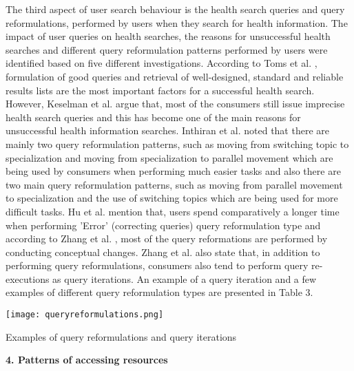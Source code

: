 \documentclass[]{article}
\begin{document}
The third aspect of user search behaviour is the health search queries and query reformulations, performed by users when they search for health information. The impact of user queries on health searches, the reasons for unsuccessful health searches and different query reformulation patterns performed by users were identified based on five different investigations. According to Toms et al. \cite{toms2007consumers}, formulation of good queries and retrieval of well-designed, standard and reliable results lists are the most important factors for a successful health search. However, Keselman et al. \cite{keselman2008consumer} argue that, most of the consumers still issue imprecise health search queries and this has become one of the main reasons for unsuccessful health information searches. Inthiran et al. \cite{inthiran2016describing} noted that there are mainly two query reformulation patterns, such as moving from switching topic to specialization and moving from specialization to parallel movement which are being used by consumers when performing much easier tasks and also there are two main query reformulation patterns, such as moving from parallel movement to specialization and the use of switching topics which are being used for more difficult tasks. Hu et al. \cite{hu2013effects} mention that, users spend comparatively a longer time when performing 'Error' (correcting queries) query reformulation type and according to Zhang et al. \cite{zhang2012health}, most of the query reformations are performed by conducting conceptual changes. Zhang et al. \cite{zhang2012health} also state that, in addition to performing query reformulations, consumers also tend to perform query re-executions as query iterations. An example of a query iteration and a few examples of different query reformulation types are presented in Table 3.  

\begin{table}[t!]
	\texttt{[image: queryreformulations.png]}
	\caption{Examples of query reformulations and query iterations\label{tabel2}}
\end{table}
 
\vspace{0.25cm}

\textbf{4. Patterns of accessing resources}\\
\end{document}
